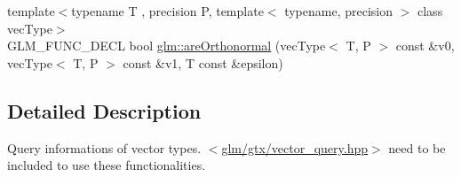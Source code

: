 \begin{DoxyCompactItemize}
\item 
{\footnotesize template$<$typename T , precision P, template$<$ typename, precision $>$ class vec\-Type$>$ }\\G\-L\-M\-\_\-\-F\-U\-N\-C\-\_\-\-D\-E\-C\-L bool \hyperlink{group__gtx__vector__query_ga89c82bc60e5b84e4489b74c15a134caf}{glm\-::are\-Orthonormal} (vec\-Type$<$ T, P $>$ const \&v0, vec\-Type$<$ T, P $>$ const \&v1, T const \&epsilon)
\end{DoxyCompactItemize}


\subsection{Detailed Description}
Query informations of vector types. $<$\hyperlink{vector__query_8hpp}{glm/gtx/vector\-\_\-query.\-hpp}$>$ need to be included to use these functionalities. 

